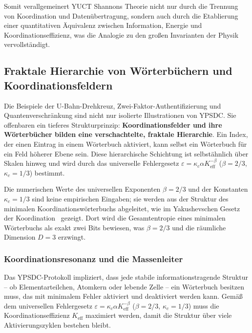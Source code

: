 \documentclass[12pt,a4paper]{article}
\theoremstyle{remark}
\begin{document}
	Somit verallgemeinert YUCT Shannons Theorie nicht nur durch die Trennung von Koordination und Datenübertragung, sondern auch durch die Etablierung einer quantitativen Äquivalenz zwischen Information, Energie und Koordinationseffizienz, was die Analogie zu den großen Invarianten der Physik vervollständigt.
	
	\subsection{Fraktale Hierarchie von Wörterbüchern und Koordinationsfeldern}
	\label{subsec:fractal-hierarchy}
	
	Die Beispiele der U-Bahn-Drehkreuz, Zwei-Faktor-Authentifizierung und Quantenverschränkung sind nicht nur isolierte Illustrationen von YPSDC. Sie offenbaren ein tieferes Strukturprinzip: \textbf{Koordinationsfelder und ihre Wörterbücher bilden eine verschachtelte, fraktale Hierarchie}. Ein Index, der einen Eintrag in einem Wörterbuch aktiviert, kann selbst ein Wörterbuch für ein Feld höherer Ebene sein. Diese hierarchische Schichtung ist selbstähnlich über Skalen hinweg und wird durch das universelle Fehlergesetz $\varepsilon = \kappa_c \alpha K_{\mathrm{eff}}^{-\beta}$ ($\beta=2/3$, $\kappa_c=1/3$) bestimmt.
	
	Die numerischen Werte des universellen Exponenten \(\beta = 2/3\) und der Konstanten \(\kappa_c = 1/3\) sind keine empirischen Eingaben; sie werden aus der Struktur des minimalen Koordinationswörterbuchs abgeleitet, wie im Yakushevschen Gesetz der Koordination~\cite{YakushevLaw2026} gezeigt. Dort wird die Gesamtentropie eines minimalen Wörterbuchs als exakt zwei Bits bewiesen, was \(\beta = 2/3\) und die räumliche Dimension \(D = 3\) erzwingt.
	
	\subsubsection{Koordinationsresonanz und die Massenleiter}
	
	Das YPSDC-Protokoll impliziert, dass jede stabile informationstragende Struktur – ob Elementarteilchen, Atomkern oder lebende Zelle – ein Wörterbuch besitzen muss, das mit minimalem Fehler aktiviert und deaktiviert werden kann. Gemäß dem universellen Fehlergesetz \(\varepsilon = \kappa_c\alpha K_{\mathrm{eff}}^{-\beta}\) (\(\beta = 2/3\), \(\kappa_c = 1/3\)) muss die Koordinationseffizienz \(K_{\mathrm{eff}}\) maximiert werden, damit die Struktur über viele Aktivierungszyklen bestehen bleibt.
	
\end{document}
